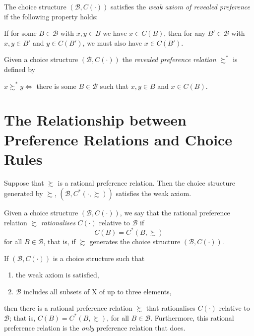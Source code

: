 \begin{defn}
    The choice structure $(\mathscr{B}, C(\cdot))$ satisfies the \emph{weak axiom of revealed preference} if the following property holds:

    If for some $B \in \mathscr{B}$ with $x, y \in B$ we have $x \in C(B)$, then for any $B' \in \mathscr{B}$ with $x, y \in B'$ and $y \in C(B')$, we must also have $x \in C(B')$.
\end{defn}

\begin{defn}
    Given a choice structure $(\mathscr{B}, C(\cdot))$ the \emph{revealed preference relation} $\succsim^*$ is defined by 

    $x \succsim^* y \iff$ there is some $B \in \mathscr{B}$ such that $x, y \in B$ and $x \in C(B)$.
\end{defn}

\section{The Relationship between Preference Relations and Choice Rules}

\begin{prop}
    Suppose that $\succsim$ is a rational preference relation. Then the choice structure generated by $\succsim$, $(\mathscr{B}, C^*(\cdot, \succsim))$ satisfies the weak axiom.
\end{prop}

\begin{defn}
    Given a choice structure $(\mathscr{B}, C(\cdot))$, we say that the rational preference relation $\succsim$ \emph{rationalises} $C(\cdot)$ relative to $\mathscr{B}$ if
    \begin{equation*}
        C(B) = C^*(B, \succsim)
    \end{equation*}
    for all $B \in \mathscr{B}$, that is, if $\succsim$ generates the choice structure $(\mathscr{B}, C(\cdot))$.
\end{defn}

\begin{prop}
    If $(\mathscr{B}, C(\cdot))$ is a choice structure such that
    \begin{enumerate}
        \item the weak axiom is satisfied,
        \item $\mathscr{B}$ includes all subsets of X of up to three elements,
    \end{enumerate}
    then there is a rational preference relation $\succsim$ that rationalises $C(\cdot)$ relative to $\mathscr{B}$; that is, $C(B) = C^*(B, \succsim)$, for all $B \in \mathscr{B}$. Furthermore, this rational preference relation is the \emph{only} preference relation that does.
\end{prop}

